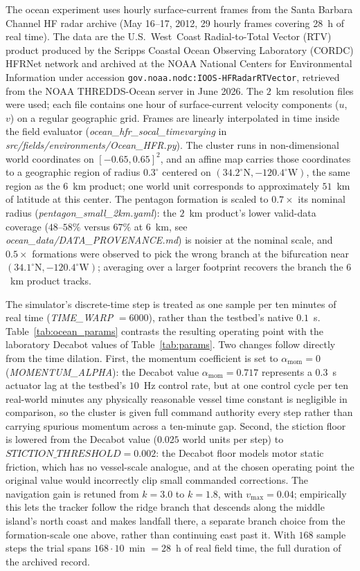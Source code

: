 \documentclass[lettersize,journal]{IEEEtran}
\begin{document}
The ocean experiment uses hourly surface-current frames from the
Santa Barbara Channel HF radar archive (May 16--17, 2012, 29 hourly
frames covering 28~h of real time). The data are the U.S.~West~Coast
Radial-to-Total Vector (RTV) product produced by the Scripps Coastal
Ocean Observing Laboratory (CORDC) HFRNet network and archived at the
NOAA National Centers for Environmental Information under accession
\texttt{gov.noaa.nodc:IOOS-HFRadarRTVector}, retrieved from the NOAA
THREDDS-Ocean server in June 2026. The $2$~km resolution files were
used; each file contains one hour of surface-current velocity
components ($u$, $v$) on a regular geographic grid. Frames are
linearly interpolated in time inside the field evaluator
(\textit{ocean\_hfr\_socal\_timevarying} in
\textit{src/fields/environments/Ocean\_HFR.py}). The cluster runs in
non-dimensional world coordinates on $[-0.65, 0.65]^2$, and an affine
map carries those coordinates to a geographic region of radius
$0.3^{\circ}$ centered on $(34.2^{\circ}\mathrm{N},
-120.4^{\circ}\mathrm{W})$, the same region as the $6$~km product; one
world unit corresponds to approximately $51$~km of latitude at this
center. The pentagon formation is scaled to $0.7\times$ its nominal
radius (\textit{pentagon\_small\_2km.yaml}): the $2$~km product's
lower valid-data coverage ($48$--$58\%$ versus $67\%$ at $6$~km, see
\textit{ocean\_data/DATA\_PROVENANCE.md}) is noisier at the nominal
scale, and $0.5\times$ formations were observed to pick the wrong
branch at the bifurcation near $(34.1^{\circ}\mathrm{N},
-120.4^{\circ}\mathrm{W})$; averaging over a larger footprint recovers
the branch the $6$~km product tracks.

The simulator's discrete-time step is treated as one sample per ten
minutes of real time (\textit{TIME\_WARP} $= 6000$), rather than the
testbed's native $0.1$~s. Table~\ref{tab:ocean_params} contrasts the
resulting operating point with the laboratory Decabot values of
Table~\ref{tab:params}. Two changes follow directly from the time
dilation. First, the momentum coefficient is set to
$\alpha_{\text{mom}} = 0$ (\textit{MOMENTUM\_ALPHA}): the Decabot value
$\alpha_{\text{mom}} = 0.717$ represents a $0.3$~s actuator lag at the
testbed's $10$~Hz control rate, but at one control cycle per ten
real-world minutes any physically reasonable vessel time constant is
negligible in comparison, so the cluster is given full command
authority every step rather than carrying spurious momentum across a
ten-minute gap. Second, the stiction floor is lowered from the
Decabot value ($0.025$ world units per step) to $\textit{STICTION\_THRESHOLD}
= 0.002$: the Decabot floor models motor static friction, which has no
vessel-scale analogue, and at the chosen operating point the original
value would incorrectly clip small commanded corrections. The
navigation gain is retuned from $k = 3.0$ to $k = 1.8$, with
$v_{\max} = 0.04$; empirically this lets the tracker follow the ridge
branch that descends along the middle island's north coast and makes
landfall there, a separate branch choice from the formation-scale one
above, rather than continuing east past it. With $168$ sample steps the trial spans
$168 \cdot 10$~min $= 28$~h of real field time, the full duration of
the archived record.
\end{document}
